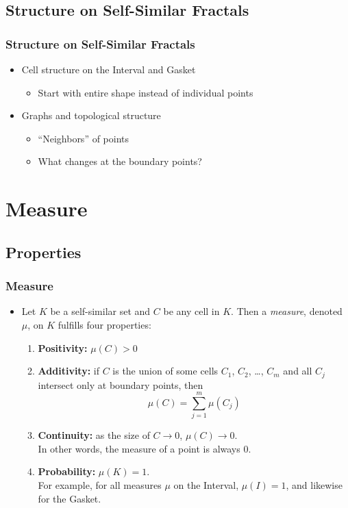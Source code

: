 \documentclass{beamer}
\begin{document}
\subsection{Structure on Self-Similar Fractals}
\begin{frame}
	\frametitle{Structure on Self-Similar Fractals}
	\begin{itemize}
		\item Cell structure on the Interval and Gasket
			\begin{itemize}
				\item Start with entire shape instead of individual points
			\end{itemize}
		\item Graphs and topological structure
			\begin{itemize}
				\item ``Neighbors'' of points
				\item What changes at the boundary points?
			\end{itemize}
	\end{itemize}
\end{frame}

\section{Measure}
\subsection{Properties}
\begin{frame}
	\frametitle{Measure}
	\begin{itemize}
		\item Let $K$ be a self-similar set and $C$ be any cell in $K$. Then a \textit{measure}, denoted $\mu$, on $K$ fulfills four properties:
			\begin{enumerate}
				\item \textbf{Positivity:} $\mu(C) > 0$
				\item \textbf{Additivity:} if $C$ is the union of some cells $C_1$, $C_2$, \ldots, $C_m$ and all $C_j$ intersect only at boundary points, then
					\[
					\mu(C) = \sum_{j = 1}^m \mu(C_j)
					\]
				\item \textbf{Continuity:} as the size of $C \to 0$, $\mu(C) \to 0$.\\
					In other words, the measure of a point is always 0.
				\item \textbf{Probability:} $\mu(K) = 1$.\\
					For example, for all measures $\mu$ on the Interval, $\mu(I) = 1$, and likewise for the Gasket.
			\end{enumerate}
	\end{itemize}
\end{frame}
\end{document}
